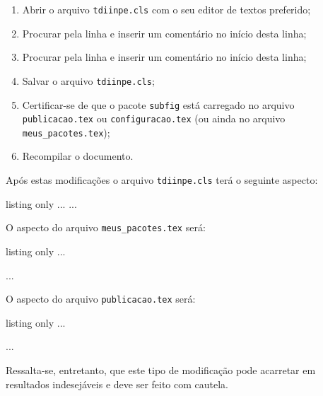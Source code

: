 \begingroup
\renewcommand{\labelenumi}{\arabic{enumi}.}
\begin{enumerate}
	\item Abrir o arquivo {\tt tdiinpe.cls} com o seu editor de textos preferido;
	\item Procurar pela linha \texttt{\RequirePackage{subfigure}} e inserir um comentário no início desta linha;
	\item Procurar pela linha \texttt{\RequirePackage[subfigure]{tocloft}} e inserir um comentário no início desta linha;
	\item Salvar o arquivo {\tt tdiinpe.cls};
  \item Certificar-se de que o pacote {\tt subfig} está carregado no arquivo {\tt publicacao.tex} ou {\tt configuracao.tex} (ou ainda no arquivo {\tt meus\_pacotes.tex});
	\item Recompilar o documento.
\end{enumerate}
\endgroup

Após estas modificações o arquivo {\tt tdiinpe.cls} terá o seguinte aspecto:

\begin{texexp}{listing only}
...
\RequirePackage{amsmath,amssymb,amsthm} %
\RequirePackage{makeidx} %
\RequirePackage{eso-pic}
...
\end{texexp}

O aspecto do arquivo {\tt meus\_pacotes.tex} será:

\begin{texexp}{listing only}
...
\usepackage{subfig}
...
\end{texexp}

O aspecto do arquivo {\tt publicacao.tex} será:

\begin{texexp}{listing only}
...


 



\makeindex  

 
...
\end{texexp}

\begin{marker}
Ressalta-se, entretanto, que este tipo de modificação pode acarretar em resultados indesejáveis e deve ser feito com cautela. 
\end{marker}

